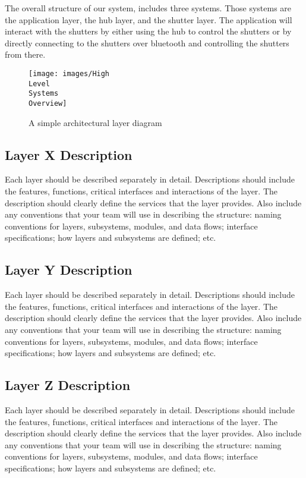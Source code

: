 The overall structure of our system, includes three systems. Those systems are the application layer, the hub layer, and the shutter layer. The application will interact with the shutters by either using the hub to control the shutters or by directly connecting to the shutters over bluetooth and controlling the shutters from there.

\begin{figure}[h!]
	\centering
 	\texttt{[image: images/High\\ Level\\ Systems\\ Overview]}
 \caption{A simple architectural layer diagram}
\end{figure}

\subsection{Layer X Description}
Each layer should be described separately in detail. Descriptions should include the features, functions, critical interfaces and interactions of the layer. The description should clearly define the services that the layer provides. Also include any conventions that your team will use in describing the structure: naming conventions for layers, subsystems, modules, and data flows; interface specifications; how layers and subsystems are defined; etc. 

\subsection{Layer Y Description}
Each layer should be described separately in detail. Descriptions should include the features, functions, critical interfaces and interactions of the layer. The description should clearly define the services that the layer provides. Also include any conventions that your team will use in describing the structure: naming conventions for layers, subsystems, modules, and data flows; interface specifications; how layers and subsystems are defined; etc. 

\subsection{Layer Z Description}
Each layer should be described separately in detail. Descriptions should include the features, functions, critical interfaces and interactions of the layer. The description should clearly define the services that the layer provides. Also include any conventions that your team will use in describing the structure: naming conventions for layers, subsystems, modules, and data flows; interface specifications; how layers and subsystems are defined; etc. 